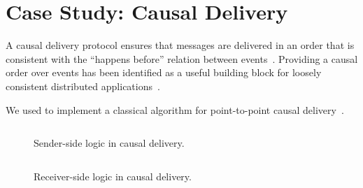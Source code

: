 \section{Case Study: Causal Delivery}
\label{sec:causal}
A causal delivery protocol ensures that messages are delivered in an order that
is consistent with the ``happens before'' relation between
events~\cite{Lamport1978}. Providing a causal order over events has been
identified as a useful building block for loosely consistent distributed
applications~\cite{Lloyd2011}.

We used \lang to implement a classical algorithm for point-to-point causal
delivery~\cite{Schiper1989}.

\begin{figure}[t]
\begin{scriptsize}
\begin{lstlisting}
\end{lstlisting}
\end{scriptsize}
\caption{Sender-side logic in causal delivery.}
\label{fig:causal-send}
\end{figure}

\begin{figure}[t]
\begin{scriptsize}
\begin{lstlisting}
\end{lstlisting}
\end{scriptsize}
\caption{Receiver-side logic in causal delivery.}
\label{fig:causal-recv}
\end{figure}
